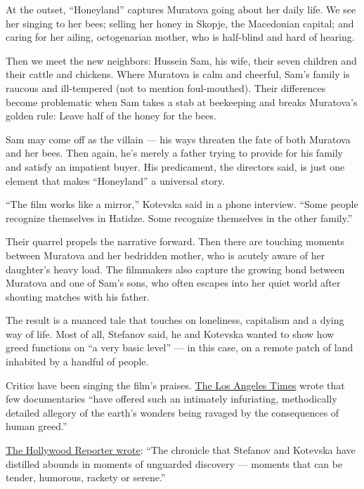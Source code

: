 At the outset, ``Honeyland'' captures Muratova going about her daily
life. We see her singing to her bees; selling her honey in Skopje, the
Macedonian capital; and caring for her ailing, octogenarian mother, who
is half-blind and hard of hearing.

Then we meet the new neighbors: Hussein Sam, his wife, their seven
children and their cattle and chickens. Where Muratova is calm and
cheerful, Sam's family is raucous and ill-tempered (not to mention
foul-mouthed). Their differences become problematic when Sam takes a
stab at beekeeping and breaks Muratova's golden rule: Leave half of the
honey for the bees.

Sam may come off as the villain --- his ways threaten the fate of both
Muratova and her bees. Then again, he's merely a father trying to
provide for his family and satisfy an impatient buyer. His predicament,
the directors said, is just one element that makes ``Honeyland'' a
universal story.

``The film works like a mirror,'' Kotevska said in a phone interview.
``Some people recognize themselves in Hatidze. Some recognize themselves
in the other family.''

Their quarrel propels the narrative forward. Then there are touching
moments between Muratova and her bedridden mother, who is acutely aware
of her daughter's heavy load. The filmmakers also capture the growing
bond between Muratova and one of Sam's sons, who often escapes into her
quiet world after shouting matches with his father.

The result is a nuanced tale that touches on loneliness, capitalism and
a dying way of life. Most of all, Stefanov said, he and Kotevska wanted
to show how greed functions on ``a very basic level'' --- in this case,
on a remote patch of land inhabited by a handful of people.

Critics have been singing the film's praises.
\href{https://www.latimes.com/entertainment-arts/movies/story/2019-07-25/honeyland-review-documentary-beekeeper}{The
Los Angeles Times} wrote that few documentaries ``have offered such an
intimately infuriating, methodically detailed allegory of the earth's
wonders being ravaged by the consequences of human greed.''

\href{https://www.hollywoodreporter.com/review/honeyland-review-1177112}{The
Hollywood Reporter wrote}: ``The chronicle that Stefanov and Kotevska
have distilled abounds in moments of unguarded discovery --- moments
that can be tender, humorous, rackety or serene.''

